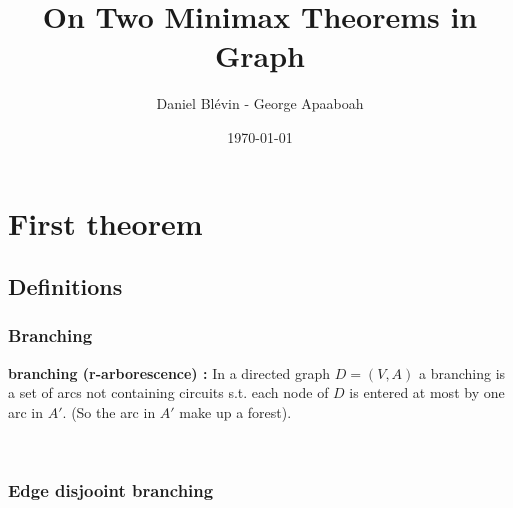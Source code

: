 \documentclass[8pt]{beamer}
\title{On Two Minimax Theorems in Graph}
\author{Daniel Blévin - George Apaaboah}
\date\today
\begin{document}
\maketitle
\begin{frame}
\tableofcontents
\end{frame}

\newtheorem{edmonds_theorem}{THEOREM}
\newtheorem{Lucchesi_and_Younger}{THEOREM}
\newtheorem{ly_lemma}{LEMMA}
\newtheorem{hypergraph}{Theorem}

\section{First theorem}
\subsection{Definitions}
\begin{frame}
\frametitle{Branching}

\textbf{branching (r-arborescence) :}
In a directed graph $D = (V, A)$ a branching is a set of arcs not containing 
circuits s.t. each node of $D$ is entered at most by one arc in $A'$. 
(So the arc in $A'$ make up a forest). %

~

\end{frame}

\begin{frame}
\frametitle{Edge disjooint branching}

\end{frame}
\end{document}
